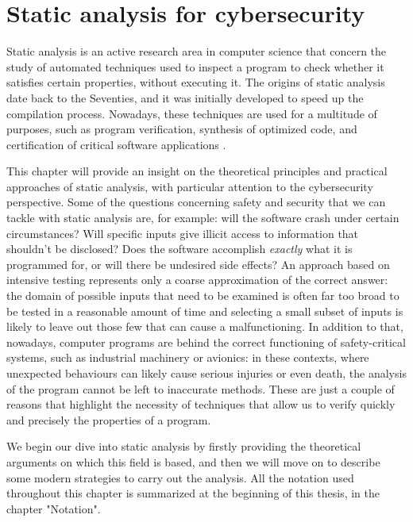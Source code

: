 \documentclass[target=mst,aauheader=aics]{thud}
\theoremstyle{definition}
\begin{document}
	\chapter{Static analysis for cybersecurity}\label{chapter:static_analysis}
	Static analysis is an active research area in computer science that concern the study of automated techniques used to inspect a program to check whether it satisfies certain properties, without executing it. The origins of static analysis date back to the Seventies, and it was initially developed to speed up the compilation process. Nowadays, these techniques are used for a multitude of purposes, such as program verification, synthesis of optimized code, and certification of critical software applications \cite{Rival2020}. 
	
	This chapter will provide an insight on the theoretical principles and practical approaches of static analysis, with particular attention to the cybersecurity perspective. Some of the questions concerning safety and security that we can tackle with static analysis are, for example: will the software crash under certain circumstances? Will specific inputs give illicit access to information that shouldn't be disclosed? Does the software accomplish \textit{exactly} what it is programmed for, or will there be undesired side effects? An approach based on intensive testing represents only a coarse approximation of the correct answer: the domain of possible inputs that need to be examined is often far too broad to be tested in a reasonable amount of time and selecting a small subset of inputs is likely to leave out those few that can cause a malfunctioning. In addition to that, nowadays, computer programs are behind the correct functioning of safety-critical systems, such as industrial machinery or avionics: in these contexts, where unexpected behaviours can likely cause serious injuries or even death, the analysis of the program cannot be left to inaccurate methods. These are just a couple of reasons that highlight the necessity of techniques that allow us to verify quickly and precisely the properties of a program.
	
	We begin our dive into static analysis by firstly providing the theoretical arguments on which this field is based, and then we will move on to describe some modern strategies to carry out the analysis. All the notation used throughout this chapter is summarized at the beginning of this thesis, in the chapter "Notation".
\end{document}

